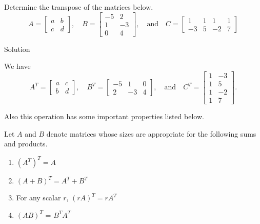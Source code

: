 \begin{example}
Determine the transpose of the matrices below.
\[ A = \left[ \begin{array}{rr} a & b  \\ c & d  \end{array} \right], \quad B = \left[ \begin{array}{rr} -5 & 2  \\ 1 & -3 \\ 0 & 4  \end{array} \right], \quad \text{and} \quad C = \left[ \begin{array}{rrrr} 1 & 1 & 1 & 1  \\ -3 & 5 & -2 & 7  \end{array} \right] \]



Solution 


We have
\[ A^T = \left[ \begin{array}{rr} a & c  \\ b & d  \end{array} \right], \quad B^T = \left[ \begin{array}{rrr} -5 & 1 & 0  \\ 2 & -3 & 4  \end{array} \right], \quad \text{and} \quad C^T = \left[ \begin{array}{rr} 1 & -3  \\ 1 & 5 \\ 1 & -2 \\ 1 & 7  \end{array} \right]. \]

\end{example}


\smallskip

Also this operation has some important properties listed below.

\begin{theorem}
Let $A$ and $B$ denote matrices whose sizes are appropriate for the following sums
and products.
\begin{enumerate}
\item $(A^T)^T = A$
\item $(A + B)^T = A^T + B^T$
\item For any scalar $r$, $(rA)^T = r A^T$
\item $(AB)^T$ = $B^T A^T$
\end{enumerate}

\end{theorem}

